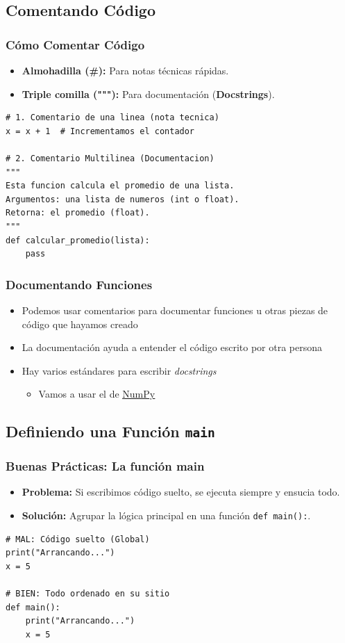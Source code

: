 \documentclass[11pt]{beamer}
\begin{document}
\subsection{Comentando Código}

\begin{frame}[fragile]\frametitle{Cómo Comentar Código}
\begin{itemize}
\item \textbf{Almohadilla (\#):} Para notas técnicas rápidas.
\item \textbf{Triple comilla ("""):} Para documentación (\textbf{Docstrings}).
\end{itemize}
\begin{lstlisting}[basicstyle=\scriptsize]
# 1. Comentario de una linea (nota tecnica)
x = x + 1  # Incrementamos el contador

# 2. Comentario Multilinea (Documentacion)
"""
Esta funcion calcula el promedio de una lista.
Argumentos: una lista de numeros (int o float).
Retorna: el promedio (float).
"""
def calcular_promedio(lista):
    pass
\end{lstlisting}
\end{frame}

\begin{frame}\frametitle{Documentando Funciones}
\begin{itemize}
\item Podemos usar comentarios para documentar funciones u otras piezas de código que hayamos creado
\item La documentación ayuda a entender el código escrito por otra persona
\item Hay varios estándares para escribir \textit{docstrings}
    \begin{itemize}
    \item Vamos a usar el de \href{https://numpydoc.readthedocs.io/en/latest/format.html}{\color{blue}\underline{NumPy}}
    \end{itemize}
\end{itemize}
\end{frame}

\subsection{Definiendo una Función \texttt{main}}

\begin{frame}[fragile]\frametitle{Buenas Prácticas: La función main}
\begin{itemize}
    \item \textbf{Problema:} Si escribimos código suelto, se ejecuta siempre y ensucia todo.
    \item \textbf{Solución:} Agrupar la lógica principal en una función \lstinline|def main():|.
\end{itemize}
\begin{lstlisting}[basicstyle=\scriptsize]
# MAL: Código suelto (Global)
print("Arrancando...")
x = 5

# BIEN: Todo ordenado en su sitio
def main():
    print("Arrancando...")
    x = 5
\end{lstlisting}
\end{frame}
\end{document}

